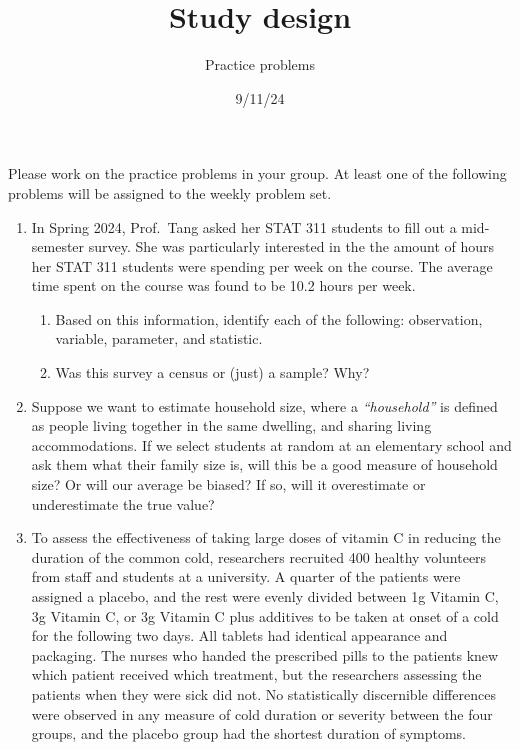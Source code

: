 \documentclass[
  letterpaper,
  DIV=11,
  numbers=noendperiod]{scrartcl}
\title{Study design}
\author{Practice problems}
\date{9/11/24}
\providecommand{\tightlist}{%
  \setlength{\itemsep}{0pt}\setlength{\parskip}{0pt}}\usepackage{longtable,booktabs,array}
\begin{document}
\maketitle
\ifdefined\Shaded\renewenvironment{Shaded}{\begin{tcolorbox}[borderline west={3pt}{0pt}{shadecolor}, enhanced, boxrule=0pt, interior hidden, sharp corners, breakable, frame hidden]}{\end{tcolorbox}}\fi

Please work on the practice problems in your group. At least one of the
following problems will be assigned to the weekly problem set.

\begin{enumerate}
\def\labelenumi{\arabic{enumi}.}
\item
  In Spring 2024, Prof.~Tang asked her STAT 311 students to fill out a
  mid-semester survey. She was particularly interested in the the amount
  of hours her STAT 311 students were spending per week on the course.
  The average time spent on the course was found to be 10.2 hours per
  week.

  \begin{enumerate}
  \def\labelenumii{\alph{enumii}.}
  \tightlist
  \item
    Based on this information, identify each of the following:
    observation, variable, parameter, and statistic.
  \item
    Was this survey a census or (just) a sample? Why?
  \end{enumerate}
\item
  Suppose we want to estimate household size, where a
  \emph{``household''} is defined as people living together in the same
  dwelling, and sharing living accommodations. If we select students at
  random at an elementary school and ask them what their family size is,
  will this be a good measure of household size? Or will our average be
  biased? If so, will it overestimate or underestimate the true value?
\item
  To assess the effectiveness of taking large doses of vitamin C in
  reducing the duration of the common cold, researchers recruited 400
  healthy volunteers from staff and students at a university. A quarter
  of the patients were assigned a placebo, and the rest were evenly
  divided between 1g Vitamin C, 3g Vitamin C, or 3g Vitamin C plus
  additives to be taken at onset of a cold for the following two days.
  All tablets had identical appearance and packaging. The nurses who
  handed the prescribed pills to the patients knew which patient
  received which treatment, but the researchers assessing the patients
  when they were sick did not. No statistically discernible differences
  were observed in any measure of cold duration or severity between the
  four groups, and the placebo group had the shortest duration of
  symptoms.


\end{enumerate}
\end{document}
